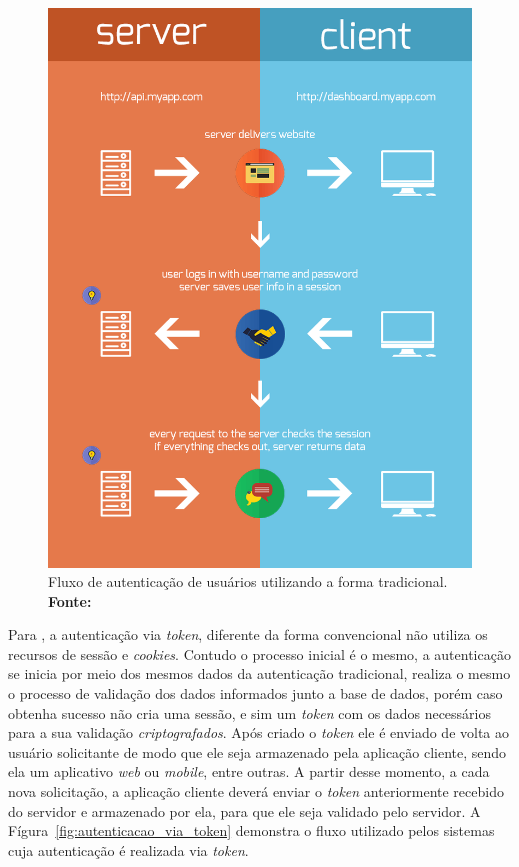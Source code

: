 \newpage
\begin{figure}[h!]
	\centerline{\includegraphics[scale=0.55]{./imagens/tokens-traditional.png}}
	\caption[Fluxo de autenticação de usuários utilizando a forma tradicional]
	{Fluxo de autenticação de usuários utilizando a forma tradicional. \textbf{Fonte:} \cite{authentication_via_token_chris_sevilleja}}
	\label{fig:autenticacao_via_sessao}
\end{figure}

Para , a autenticação via \textit{token}, diferente da forma convencional não utiliza os recursos de sessão e \textit{cookies}. Contudo o processo inicial é o mesmo, a autenticação se inicia por meio dos mesmos dados da autenticação tradicional, realiza o mesmo o processo de validação dos dados informados junto a base de dados, porém caso obtenha sucesso não cria uma sessão, e sim um \textit{token} com os dados necessários para a sua validação \textit{criptografados}. Após criado o \textit{token} ele é enviado de volta ao usuário solicitante de modo que ele seja armazenado pela aplicação cliente, sendo ela um aplicativo \textit{web} ou \textit{mobile}, entre outras. A partir desse momento, a cada nova solicitação, a aplicação cliente deverá enviar o \textit{token} anteriormente recebido do servidor e armazenado por ela, para que ele seja validado pelo servidor. A Fígura~\ref{fig:autenticacao_via_token} demonstra o fluxo utilizado pelos sistemas cuja autenticação é realizada via \textit{token}.

